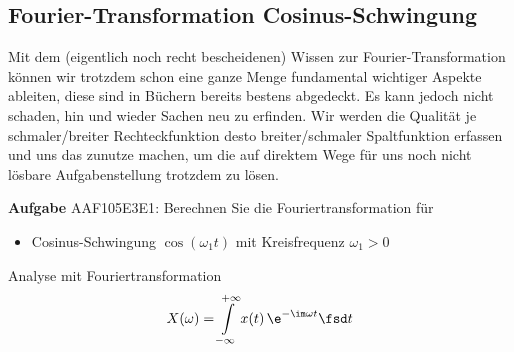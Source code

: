 \subsection{Fourier-Transformation Cosinus-Schwingung}
\label{sec:AAF105E3E1}
\begin{Ziel}
Mit dem (eigentlich noch recht bescheidenen) Wissen zur Fourier-Transformation
können wir trotzdem schon eine ganze Menge fundamental wichtiger Aspekte ableiten,
diese sind in Büchern bereits bestens abgedeckt.
Es kann jedoch nicht schaden, hin und wieder Sachen neu zu erfinden.
Wir werden die Qualität je schmaler/breiter Rechteckfunktion desto breiter/schmaler
Spaltfunktion erfassen und uns das zunutze machen, um die auf direktem Wege
für uns noch nicht lösbare Aufgabenstellung trotzdem zu lösen.
\end{Ziel}
\textbf{Aufgabe} {\tiny AAF105E3E1}: Berechnen Sie die Fouriertransformation für
\begin{itemize}
\item Cosinus-Schwingung $\cos(\omega_1 t)$ mit Kreisfrequenz $\omega_1>0$
\end{itemize}
\begin{Werkzeug}
Analyse mit Fouriertransformation
\begin{align}
X(\omega) = \int\limits_{-\infty}^{+\infty} x(t) \, \e^{-\im \omega t} \fsd t
\end{align}
\end{Werkzeug}
